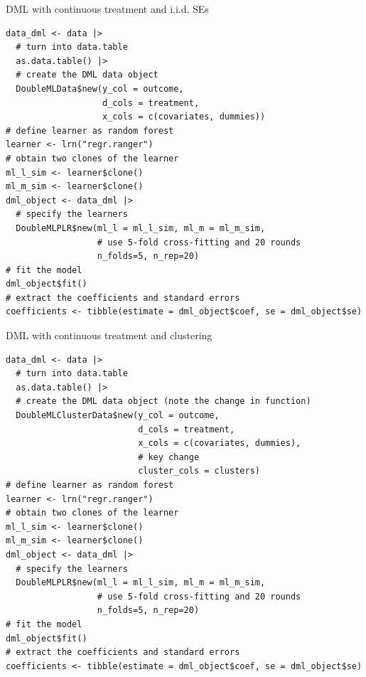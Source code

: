 \documentclass[10pt,table,aspectratio=169]{beamer}
\begin{document}
\begin{frame}[plain,fragile,label=two_dimensions]{DML with continuous treatment and i.i.d. SEs}

\begin{verbatim}
data_dml <- data |>
  # turn into data.table
  as.data.table() |>
  # create the DML data object
  DoubleMLData$new(y_col = outcome,
                   d_cols = treatment,
                   x_cols = c(covariates, dummies))
# define learner as random forest
learner <- lrn("regr.ranger")
# obtain two clones of the learner
ml_l_sim <- learner$clone()
ml_m_sim <- learner$clone()
dml_object <- data_dml |>
  # specify the learners
  DoubleMLPLR$new(ml_l = ml_l_sim, ml_m = ml_m_sim,
                  # use 5-fold cross-fitting and 20 rounds
                  n_folds=5, n_rep=20)
# fit the model
dml_object$fit()
# extract the coefficients and standard errors
coefficients <- tibble(estimate = dml_object$coef, se = dml_object$se)
\end{verbatim}
\end{frame}

\begin{frame}[plain,fragile,label=two_dimensions]{DML with continuous treatment and clustering}
\begin{verbatim}
data_dml <- data |>
  # turn into data.table
  as.data.table() |>
  # create the DML data object (note the change in function)
  DoubleMLClusterData$new(y_col = outcome,
                          d_cols = treatment,
                          x_cols = c(covariates, dummies),
                          # key change
                          cluster_cols = clusters)
# define learner as random forest
learner <- lrn("regr.ranger")
# obtain two clones of the learner
ml_l_sim <- learner$clone()
ml_m_sim <- learner$clone()
dml_object <- data_dml |>
  # specify the learners
  DoubleMLPLR$new(ml_l = ml_l_sim, ml_m = ml_m_sim,
                  # use 5-fold cross-fitting and 20 rounds
                  n_folds=5, n_rep=20)
# fit the model
dml_object$fit()
# extract the coefficients and standard errors
coefficients <- tibble(estimate = dml_object$coef, se = dml_object$se)
\end{verbatim}
\end{frame}
\end{document}

